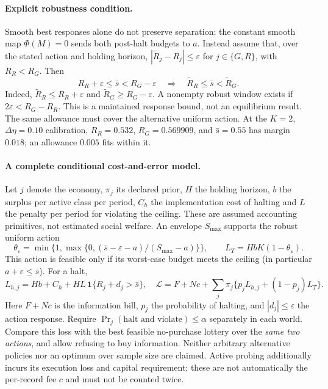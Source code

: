 \paragraph{Explicit robustness condition.} Smooth best responses alone do not preserve separation: the constant smooth map $\Phi(M)=0$ sends both post-halt budgets to $a$. Instead assume that, over the stated action and holding horizon, $|\widetilde R_j-R_j|\le\varepsilon$ for $j\in\{G,R\}$, with $R_R<R_G$. Then
\begin{equation}\label{eq:reopt_gap}
 R_R+\varepsilon\le\bar s<R_G-\varepsilon
 \quad\Longrightarrow\quad \widetilde R_R\le\bar s<\widetilde R_G.
\end{equation}
Indeed, $\widetilde R_R\le R_R+\varepsilon$ and $\widetilde R_G\ge R_G-\varepsilon$. A nonempty robust window exists if $2\varepsilon<R_G-R_R$. This is a maintained response bound, not an equilibrium result. The same allowance must cover the alternative uniform action. At the $K=2$, $\Delta\eta=0.10$ calibration, $R_R=0.532$, $R_G=0.569909$, and $\bar s=0.55$ has margin $0.018$; an allowance $0.005$ fits within it.

\paragraph{A complete conditional cost-and-error model.} Let $j$ denote the economy, $\pi_j$ its declared prior, $H$ the holding horizon, $b$ the surplus per active class per period, $C_h$ the implementation cost of halting and $L$ the penalty per period for violating the ceiling. These are assumed accounting primitives, not estimated social welfare. An envelope $S_{\max}$ supports the robust uniform action
\[
\theta_\varepsilon=\min\{1,\max\{0,(\bar s-\varepsilon-a)/(S_{\max}-a)\}\},\qquad
 L_T=HbK(1-\theta_\varepsilon).
\]
This action is feasible only if its worst-case budget meets the ceiling (in particular $a+\varepsilon\le\bar s$). For a halt,
\[
 L_{h,j}=Hb+C_h+HL\,\mathbf1\{R_j+d_j>\bar s\},\quad
 \mathcal L=F+Nc+\sum_j\pi_j\{p_jL_{h,j}+(1-p_j)L_T\}.
\]
Here $F+Nc$ is the information bill, $p_j$ the probability of halting, and $|d_j|\le\varepsilon$ the action response. Require $\Pr_j(\text{halt and violate})\le\alpha$ separately in each world. Compare this loss with the best feasible no-purchase lottery over the \emph{same two actions}, and allow refusing to buy information. Neither arbitrary alternative policies nor an optimum over sample size are claimed. Active probing additionally incurs its execution loss and capital requirement; these are not automatically the per-record fee $c$ and must not be counted twice.

